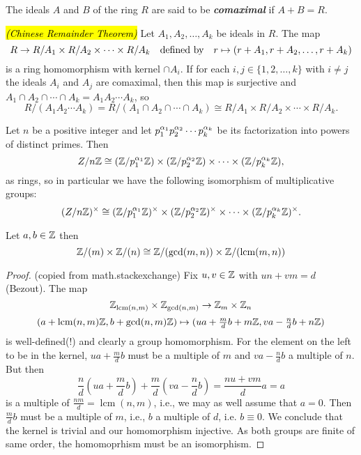 \nl

\begin{defn}
The ideals $A$ and $B$ of the ring $R$ are said to be \textbf{\textit{comaximal}} if $A + B = R$.
\end{defn}

\nl

\begin{thm}\hl{\textit{(Chinese Remainder Theorem)}} Let $A_1,A_2,\ldots,A_k$ be ideals in $R$. The map
\[R\rightarrow R/A_1\times R/A_2\times\cdots\times R/A_k\quad\text{defined by}\quad r\mapsto(r+A_1,r+A_2,\ldots,r+A_k)\]
is a ring homomorphism with kernel $\cap A_i$. If for each $i,j\in\{1,2,\ldots,k\}$ with $i\neq j$ the ideals $A_i$ and $A_j$ are comaximal, then this map is surjective and $A_1\cap A_2\cap\cdots\cap A_k = A_1A_2\cdots A_k$, so
\[R/(A_1A_2\cdots A_k) = R/(A_1\cap A_2\cap\cdots\cap A_k) \cong R/A_1\times R/A_2\times\cdots\times R/A_k.\]
\end{thm}

\nl

\begin{cor}
Let $n$ be a positive integer and let $p_1^{\alpha_1}p_2^{\alpha_2}\cdots p_k^{\alpha_k}$ be its factorization into powers of distinct primes. Then
\[Z/n\mathbb{Z} \cong (\mathbb{Z}/p_1^{\alpha_1}\mathbb{Z})\times(\mathbb{Z}/p_2^{\alpha_2}\mathbb{Z})\times\cdots\times (\mathbb{Z}/p_k^{\alpha_k}\mathbb{Z}),\]
as rings, so in particular we have the following isomorphism of multiplicative groups:
\[(Z/n\mathbb{Z})^\times \cong (\mathbb{Z}/p_1^{\alpha_1}\mathbb{Z})^\times\times(\mathbb{Z}/p_2^{\alpha_2}\mathbb{Z})^\times\times\cdots\times (\mathbb{Z}/p_k^{\alpha_k}\mathbb{Z})^\times.\]
\end{cor}

\nl

\begin{cor}
Let $a,b\in \mathbb{Z}$ then
\[\mathbb{Z}/(m)\times \mathbb{Z}/(n) \cong \mathbb{Z}/(\gcd(m,n))\times \mathbb{Z}/(\text{lcm}(m,n))\]
\end{cor}

\begin{proof}(copied from math.stackexchange)
Fix $u,v\in\Bbb Z$ with $un+vm=d$ (Bezout). 
The map $$\Bbb Z_{\operatorname{lcm}(n,m)}\times\Bbb Z_{\gcd(n,m)} \to\Bbb Z_m\times\Bbb Z_n$$
$$ (a+\operatorname{lcm}(n,m)\Bbb Z,b+\gcd(n,m)\Bbb Z)\mapsto(ua+\tfrac mdb+m\Bbb Z,va-\tfrac ndb+n\Bbb Z)$$
is well-defined(!) and clearly a group homomorphism.
For the element on the left to be in the kernel, 
$ua+\tfrac mdb$ must be a multiple of $m$ and $va-\tfrac ndb$ a multiple of $n$.
But then
$$\frac nd\left(ua+\frac mdb\right)+\frac md\left(va-\frac ndb\right) 
=\frac{nu+vm}{d}a=a$$ 
is a multiple of $\frac{nm}d=\operatorname{lcm}(n,m)$, i.e., we may as well assume that $a=0$. Then $\frac mdb$ must be a multiple of $m$, i.e., $b$ a multiple of $d$, i.e. $b\equiv 0$. We conclude that the kernel is trivial and our homomorphism injective. As both groups are finite of same order, the homomoprhism must be an isomorphism.
\end{proof}